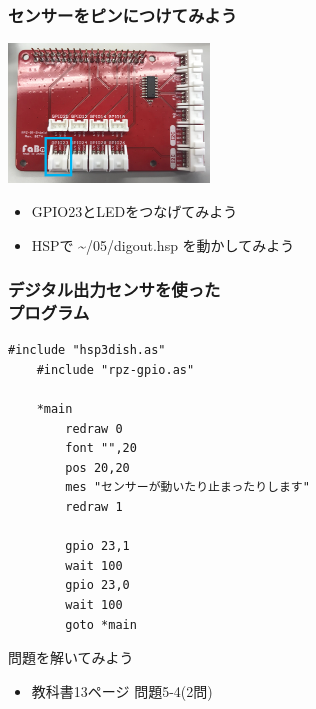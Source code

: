 \begin{frame}
    \frametitle{センサーをピンにつけてみよう}
    \begin{center}
        \includegraphics[width=0.4\textwidth]{images/chap05/text05-img027.png}
        \begin{itemize}
            \item GPIO23とLEDをつなげてみよう
            \item HSPで	\textasciitilde/05/digout.hsp を動かしてみよう
        \end{itemize}
    \end{center}
\end{frame}

\begin{frame}[fragile]
    \frametitle{デジタル出力センサを使った\\プログラム}
    \begin{lstlisting}[title=\textasciitilde/05/digout.hsp]
    #include "hsp3dish.as"
    #include "rpz-gpio.as"

    *main
        redraw 0
        font "",20
        pos 20,20
        mes "センサーが動いたり止まったりします"
        redraw 1

        gpio 23,1
        wait 100
        gpio 23,0
        wait 100
        goto *main
    \end{lstlisting}
\end{frame}

\begin{frame}[fragile]
    \begin{exampleblock}{問題を解いてみよう}
        \begin{itemize}
            \item 教科書13ページ 問題5-4(2問)
        \end{itemize}
    \end{exampleblock}
\end{frame}